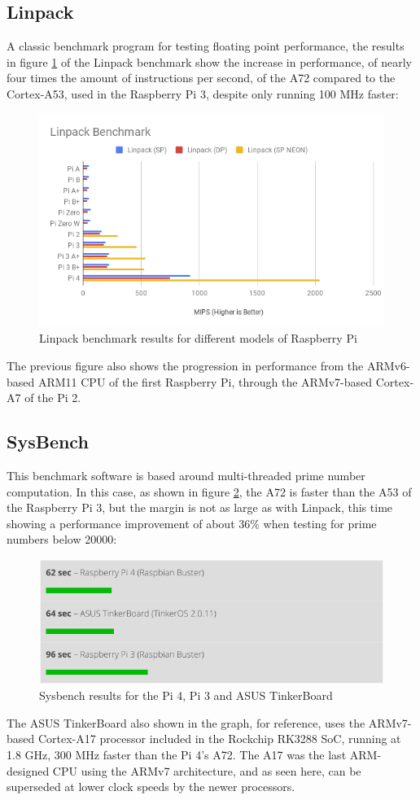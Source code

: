 \subsection*{Linpack}
\hspace{\parindent}A classic benchmark program for testing floating point performance, the results in figure \ref{linpack} of the Linpack benchmark show the increase in performance, of nearly four times the amount of instructions per second, of the A72 compared to the Cortex-A53, used in the Raspberry Pi 3, despite only running 100 MHz faster: \cite{linpack}
\begin{figure}[H]
	\begin{center}
		\includegraphics[width=0.7\linewidth]{imgs/linpack.png}
		\caption{Linpack benchmark results for different models of Raspberry Pi}
		\label{linpack}
	\end{center}
\end{figure}
The previous figure also shows the progression in performance from the ARMv6-based ARM11 CPU of the first Raspberry Pi, through the ARMv7-based Cortex-A7 of the Pi 2.
\subsection*{SysBench}
\hspace{\parindent}This benchmark software is based around multi-threaded prime number computation. In this case, as shown in figure \ref{sysbench}, the A72 is faster than the A53 of the Raspberry Pi 3, but the margin is not as large as with Linpack, this time showing a performance improvement of about 36\% when testing for prime numbers below 20000: \cite{sysbench}
\begin{figure}[H]
	\begin{center}
		\includegraphics[width=0.7\linewidth]{imgs/sysbench.png}
		\caption{Sysbench results for the Pi 4, Pi 3 and ASUS TinkerBoard}
		\label{sysbench}
	\end{center}
\end{figure}
The ASUS TinkerBoard also shown in the graph, for reference, uses the ARMv7-based Cortex-A17 processor included in the Rockchip RK3288 SoC, running at 1.8 GHz, 300 MHz faster than the Pi 4's A72. The A17 was the last ARM-designed CPU using the ARMv7 architecture, and as seen here, can be superseded at lower clock speeds by the newer processors.